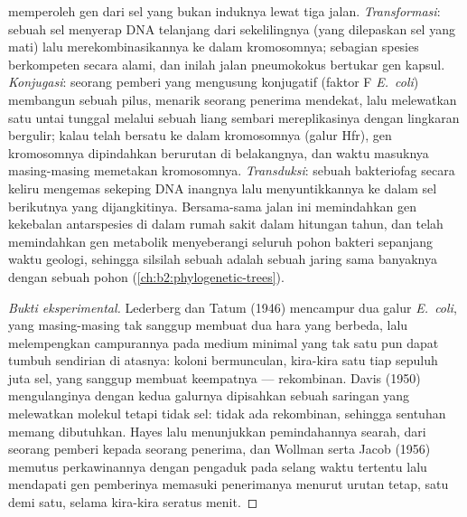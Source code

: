 \begin{definition}\label{def:b2:genome-diversification:hgt}
 memperoleh gen dari sel yang bukan induknya lewat tiga jalan.
\emph{Transformasi}: sebuah sel menyerap DNA telanjang dari
sekelilingnya (yang dilepaskan sel yang mati) lalu merekombinasikannya
ke dalam kromosomnya; sebagian spesies berkompeten secara alami, dan
inilah jalan pneumokokus bertukar gen kapsul. \emph{Konjugasi}:
seorang pemberi yang mengusung  konjugatif (faktor F
\emph{E.~coli}) membangun sebuah pilus, menarik seorang penerima
mendekat, lalu melewatkan satu untai tunggal  melalui sebuah
liang sembari mereplikasinya dengan lingkaran bergulir; kalau
 telah bersatu ke dalam kromosomnya (galur Hfr), gen
kromosomnya dipindahkan berurutan di belakangnya, dan waktu masuknya
masing-masing memetakan kromosomnya. \emph{Transduksi}: sebuah
bakteriofag secara keliru mengemas sekeping DNA inangnya lalu
menyuntikkannya ke dalam sel berikutnya yang dijangkitinya. Bersama-sama
jalan ini memindahkan gen kekebalan antarspesies di dalam rumah sakit
dalam hitungan tahun, dan telah memindahkan gen metabolik menyeberangi
seluruh pohon bakteri sepanjang waktu geologi, sehingga silsilah
sebuah  adalah sebuah jaring sama banyaknya dengan sebuah
pohon (\cref{ch:b2:phylogenetic-trees}).
\end{definition}
\begin{proof}[Bukti eksperimental]
Lederberg dan Tatum (1946) mencampur dua galur \emph{E.~coli}, yang
masing-masing tak sanggup membuat dua hara yang berbeda, lalu
melempengkan campurannya pada medium minimal yang tak satu pun dapat
tumbuh sendirian di atasnya: koloni bermunculan, kira-kira satu tiap
sepuluh juta sel, yang sanggup membuat keempatnya --- rekombinan.
Davis (1950) mengulanginya dengan kedua galurnya dipisahkan sebuah
saringan yang melewatkan molekul tetapi tidak sel: tidak ada
rekombinan, sehingga sentuhan memang dibutuhkan. Hayes lalu menunjukkan
pemindahannya searah, dari seorang pemberi kepada seorang penerima, dan
Wollman serta Jacob (1956) memutus perkawinannya dengan pengaduk pada
selang waktu tertentu lalu mendapati gen pemberinya memasuki penerimanya
menurut urutan tetap, satu demi satu, selama kira-kira seratus menit.
\end{proof}

